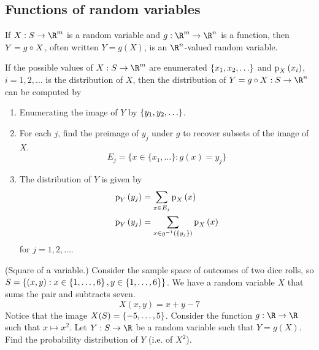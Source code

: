 \documentclass[11pt]{article}
\begin{document}
\subsection{Functions of random variables}

\begin{defn}
    \label{def:function-rv}
    If $X : S \to \R^m$ is a random variable and $g : \R^m \to \R^n$ is a
    function, then $Y = g \circ X$, often written $Y = g(X)$, is an
    $\R^n$-valued random variable.
\end{defn}

\begin{rem}
    If the possible values of $X : S \to \R^m$ are enumerated
    $\left\{x_1, x_2, \ldots\right\}$ and $\p[X]{x_i}$, $i = 1,2,\ldots$ is the
    distribution of $X$, then the distribution of
    $Y = g \compose X : S \to \R^n$ can be computed by
    \begin{enumerate}
        \item
            Enumerating the image of $Y$ by $\left\{y_1, y_2, \ldots\right\}$.

        \item
            For each $j$, find the preimage of $y_j$ under $g$ to recover
            subsets of the image of $X$.
            \begin{equation*}
                E_j = \{ x \in \{x_1, \ldots\} : g(x) = y_j \}
            \end{equation*}

        \item
            The distribution of $Y$ is given by
            \begin{align}
                \p[Y]{y_j} &= \sum_{x \in E_j} {\p[X]{x}} \notag \\
                \p[Y]{y_j} &= \sum_{x \in g\preimage{y_j}} {\p[X]{x}}
                \label{eq:pmf-of-composite-rv}
            \end{align}
            for $j = 1,2,\ldots$.
    \end{enumerate}
\end{rem}

\begin{eg}{(Square of a variable.)}
    Consider the sample space of outcomes of two dice rolls, so
    $S = \setof{(x, y) : x \in \range{6}, y \in \range{6}}$.
    We have a random variable $X$ that sums the pair and subtracts seven.
    \begin{equation*}
        X(x, y) = x + y - 7
    \end{equation*}
    Notice that the image $X(S) = \range[-5]{5}$.
    Consider the function $g : \R \to \R$ such that $x \mapsto x^2$.
    Let $Y : S \to \R$ be a random variable such that $Y = g(X)$.
    Find the probability distribution of $Y$ (i.e. of $X^2$).
\end{eg}
\end{document}
